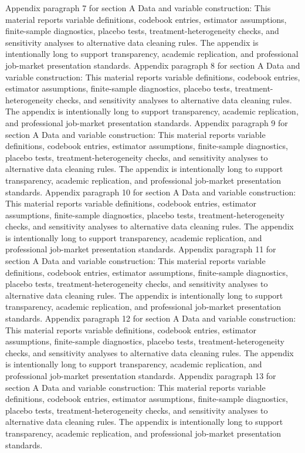 \documentclass[preprint,12pt]{elsarticle}
\begin{document}
Appendix paragraph 7 for section A Data and variable construction: This material reports variable definitions, codebook entries, estimator assumptions, finite-sample diagnostics, placebo tests, treatment-heterogeneity checks, and sensitivity analyses to alternative data cleaning rules. The appendix is intentionally long to support transparency, academic replication, and professional job-market presentation standards.
Appendix paragraph 8 for section A Data and variable construction: This material reports variable definitions, codebook entries, estimator assumptions, finite-sample diagnostics, placebo tests, treatment-heterogeneity checks, and sensitivity analyses to alternative data cleaning rules. The appendix is intentionally long to support transparency, academic replication, and professional job-market presentation standards.
Appendix paragraph 9 for section A Data and variable construction: This material reports variable definitions, codebook entries, estimator assumptions, finite-sample diagnostics, placebo tests, treatment-heterogeneity checks, and sensitivity analyses to alternative data cleaning rules. The appendix is intentionally long to support transparency, academic replication, and professional job-market presentation standards.
Appendix paragraph 10 for section A Data and variable construction: This material reports variable definitions, codebook entries, estimator assumptions, finite-sample diagnostics, placebo tests, treatment-heterogeneity checks, and sensitivity analyses to alternative data cleaning rules. The appendix is intentionally long to support transparency, academic replication, and professional job-market presentation standards.
Appendix paragraph 11 for section A Data and variable construction: This material reports variable definitions, codebook entries, estimator assumptions, finite-sample diagnostics, placebo tests, treatment-heterogeneity checks, and sensitivity analyses to alternative data cleaning rules. The appendix is intentionally long to support transparency, academic replication, and professional job-market presentation standards.
Appendix paragraph 12 for section A Data and variable construction: This material reports variable definitions, codebook entries, estimator assumptions, finite-sample diagnostics, placebo tests, treatment-heterogeneity checks, and sensitivity analyses to alternative data cleaning rules. The appendix is intentionally long to support transparency, academic replication, and professional job-market presentation standards.
Appendix paragraph 13 for section A Data and variable construction: This material reports variable definitions, codebook entries, estimator assumptions, finite-sample diagnostics, placebo tests, treatment-heterogeneity checks, and sensitivity analyses to alternative data cleaning rules. The appendix is intentionally long to support transparency, academic replication, and professional job-market presentation standards.
\end{document}
